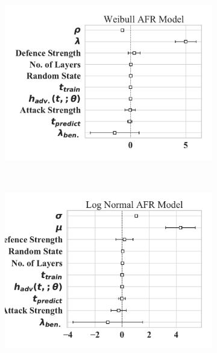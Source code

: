 \begin{figure}[h!]
    \begin{subfigure}[t]{0.3\textwidth}
        \centering
        \includegraphics[width=\textwidth]{cifar100/weibull_aft.pdf}
    \end{subfigure}%
    ~ 
    \begin{subfigure}[t]{0.3\textwidth}
        \centering
        \includegraphics[width=\textwidth]{cifar100/log_normal_aft.pdf}
    \end{subfigure}
    ~
    \begin{subfigure}[t]{0.3\textwidth}
        \centering

\end{subfigure}
\end{figure}

